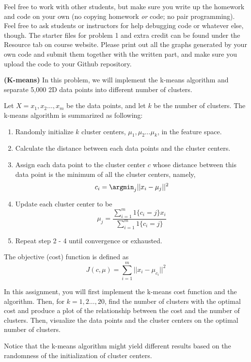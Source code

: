 \documentclass[12pt,letterpaper,fleqn]{hmcpset}
\begin{document}
Feel free to work with other students, but make sure you write up the homework
and code on your own (no copying homework \textit{or} code; no pair programming).
Feel free to ask students or instructors for help debugging code or whatever else,
though.
\newline
\newline
The starter files for problem 1 and extra credit can be found under the Resource tab on course website. Please print out all the graphs generated by your own code and submit them together with the written part, and make sure you upload the code to your Github repository.



\begin{problem}[1]
	\textbf{(K-means)} In this problem, we will implement the k-means algorithm and separate 5,000 2D data points into different number of clusters.
	\newline
	\par Let $X = {x_1, x_2 \ldots, x_m} $ be the data points, and let $k$ be the number of clusters. The k-means algorithm is summarized as following:
	\begin{enumerate}[1.]
		\item Randomly initialize $k$ cluster centers, $\mu_1, \mu_2 \ldots \mu_k$, in the feature space.
		\item Calculate the distance between each data points and the cluster centers.
		\item Assign each data point to the cluster center $c$ whose distance between this data point is the minimum of all the cluster centers, namely, \[
			      c_i = \argmin_j ||x_i - \mu_j||^2
		      \]
		\item Update each cluster center to be\[
			      \mu_j = \frac{\sum_{i=1}^{m}1\{c_i = j\}x_i}{\sum_{i = 1}^{m}1\{c_i = j\}}
		      \]
		\item Repeat step 2 - 4 until convergence or exhausted.
	\end{enumerate}
	\par
	The objective (cost) function is defined as \[
		J(c, \mu) = \sum_{i = 1}^{m}||x_i - \mu_{c_i}||^2
	\]

	\par In this assignment, you will first implement the k-means cost function and the algorithm. Then, for $k = 1, 2 \ldots, 20$, find the number of clusters with the optimal cost and produce a plot of the relationship between the cost and the number of clusters. Then, visualize the data points and the cluster centers on the optimal number of clusters.
	\newline
	\par Notice that the k-means algorithm might yield different results based on the randomness of the initialization of cluster centers.
\end{problem}
\begin{solution}
	\vfill
\end{solution}
\newpage
\end{document}
